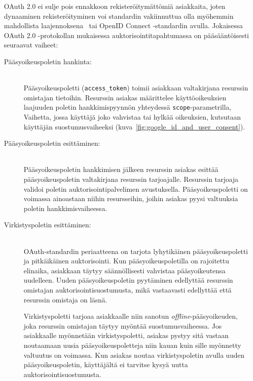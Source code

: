 \documentclass[finnish,gradu]{tktltiki}
\begin{document}
  OAuth 2.0 ei sulje pois ennakkoon rekisteröitymättömiä asiakkaita, joten dynaaminen rekisteröityminen voi standardin vakiinnuttua olla myöhemmin mahdollista laajennoksena~\cite{ietf_oauth2_unregistered_clients} tai OpenID Connect -standardin avulla. Jokaisessa OAuth 2.0 -protokollan mukaisessa auktorisointitapahtumassa on pääsääntöisesti seuraavat vaiheet:

  \begin{description}

  \item[Pääsyoikeuspoletin hankinta:] \hfill \\
  Pääsyoikeuspoletti (\verb!access_token!) toimii asiakkaan valtakirjana resurssin omistajan tietoihin. Resurssin asiakas määrittelee käyttöoikeuksien laajuuden poletin hankkimispyynnön yhteydessä \verb!scope!-parametrilla, Vaihetta, jossa käyttäjä joko vahvistaa tai hylkää oikeuksien, kutsutaan käyttäjän suostumusvaiheeksi (kuva~\ref{fig:google_id_and_user_consent}).

  \item[Pääsyoikeuspoletin esittäminen:] \hfill \\
  Pääsyoikeuspoletin hankkimisen jälkeen resurssin asiakas esittää pääsyoikeuspoletin valtakirjana resurssin tarjoajalle. Resurssin tarjoaja validoi poletin auktorisointipalvelimen avustuksella. Pääsyoikeuspoletti on voimassa ainoastaan niihin resursseihin, joihin asiakas pyysi valtuuksia poletin hankkimisvaiheessa.

  \item[Virkistyspoletin esittäminen:] \hfill \\
  OAuth-standardin periaatteena on tarjota lyhytikäinen pääsyoikeuspoletti ja pitkäikäinen auktorisointi. Kun pääsyoikeuspoletilla on rajoitettu elinaika, asiakkaan täytyy säännöllisesti vahvistaa pääsyoikeutensa uudelleen. Uuden pääsyoikeuspoletin pyytäminen edellyttää resurssin omistajan auktorisointisuostumusta, mikä vastaavasti edellyttää että resurssin omistaja on läsnä.

  Virkistyspoletti tarjoaa asiakkaalle niin sanotun \emph{offline}-pääsyoikeuden, joka resurssin omistajan täytyy myöntää suostumusvaiheessa. Jos asiakkaalle myönnetään virkistyspoletti, asiakas pystyy sitä vastaan noutaamaan uusia pääsyoikeuspoletteja niin kauan kuin sille myönnetty valtuutus on voimassa. Kun asiakas noutaa virkistyspoletin avulla uuden pääsyoikeuspoletin, käyttäjältä ei tarvitse kysyä uutta auktorisointisuostumusta.

  \end{description}
\end{document}
